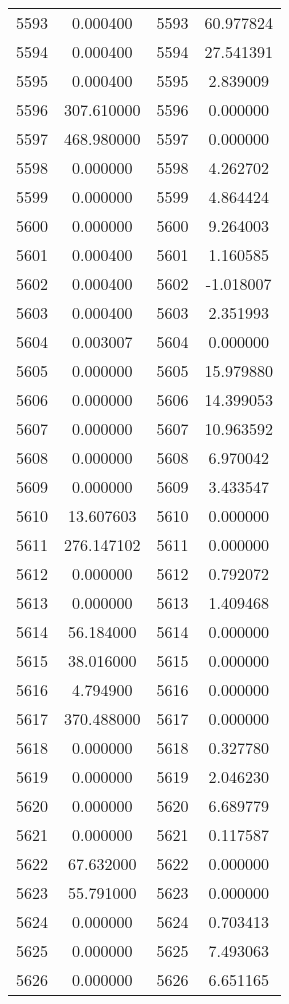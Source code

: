 \documentclass[12pt]{article}
\begin{document}
\begin{longtable}{@{}cccc@{}}
5593 & 0.000400 & 5593 & 60.977824 \\
5594 & 0.000400 & 5594 & 27.541391 \\
5595 & 0.000400 & 5595 & 2.839009 \\
5596 & 307.610000 & 5596 & 0.000000 \\
5597 & 468.980000 & 5597 & 0.000000 \\
5598 & 0.000000 & 5598 & 4.262702 \\
5599 & 0.000000 & 5599 & 4.864424 \\
5600 & 0.000000 & 5600 & 9.264003 \\
5601 & 0.000400 & 5601 & 1.160585 \\
5602 & 0.000400 & 5602 & -1.018007 \\
5603 & 0.000400 & 5603 & 2.351993 \\
5604 & 0.003007 & 5604 & 0.000000 \\
5605 & 0.000000 & 5605 & 15.979880 \\
5606 & 0.000000 & 5606 & 14.399053 \\
5607 & 0.000000 & 5607 & 10.963592 \\
5608 & 0.000000 & 5608 & 6.970042 \\
5609 & 0.000000 & 5609 & 3.433547 \\
5610 & 13.607603 & 5610 & 0.000000 \\
5611 & 276.147102 & 5611 & 0.000000 \\
5612 & 0.000000 & 5612 & 0.792072 \\
5613 & 0.000000 & 5613 & 1.409468 \\
5614 & 56.184000 & 5614 & 0.000000 \\
5615 & 38.016000 & 5615 & 0.000000 \\
5616 & 4.794900 & 5616 & 0.000000 \\
5617 & 370.488000 & 5617 & 0.000000 \\
5618 & 0.000000 & 5618 & 0.327780 \\
5619 & 0.000000 & 5619 & 2.046230 \\
5620 & 0.000000 & 5620 & 6.689779 \\
5621 & 0.000000 & 5621 & 0.117587 \\
5622 & 67.632000 & 5622 & 0.000000 \\
5623 & 55.791000 & 5623 & 0.000000 \\
5624 & 0.000000 & 5624 & 0.703413 \\
5625 & 0.000000 & 5625 & 7.493063 \\
5626 & 0.000000 & 5626 & 6.651165 \\

\end{longtable}
\end{document}
